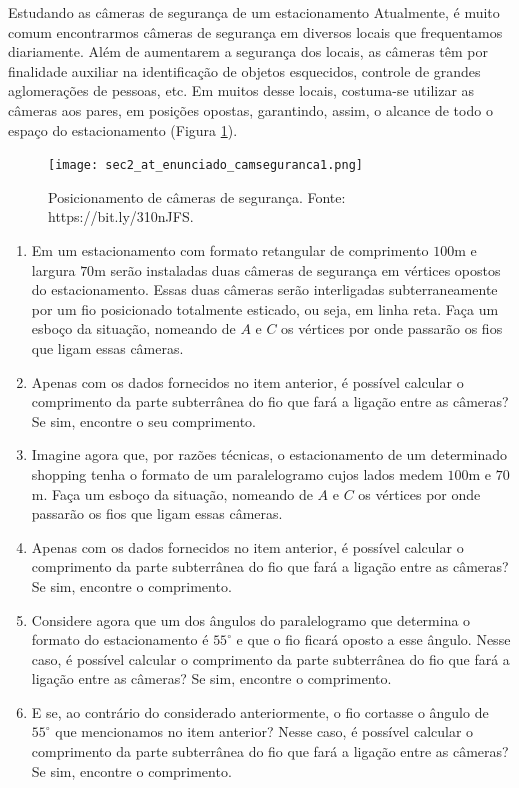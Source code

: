 \begin{task}{Estudando as câmeras de segurança de um estacionamento}
Atualmente, é muito comum encontrarmos câmeras de segurança em diversos locais que frequentamos diariamente. 
%
Além de aumentarem a segurança dos locais, as câmeras têm por finalidade auxiliar na identificação de objetos esquecidos, controle de grandes aglomerações de pessoas, etc. Em muitos desse locais, costuma-se utilizar as câmeras aos pares,  em posições opostas, garantindo, assim, o alcance de todo o espaço do estacionamento (Figura \ref{sec2_at_fig_camseguranca1}). 
 
\begin{figure}[H]
    \centering
    \texttt{[image: sec2\_at\_enunciado\_camseguranca1.png]}
    \caption{Posicionamento de câmeras de segurança. Fonte: https://bit.ly/310nJFS.}
    \label{sec2_at_fig_camseguranca1}
\end{figure}

\begin{enumerate}
    \item{}
    Em um estacionamento com formato retangular de comprimento $100$m e largura $70$m serão instaladas duas câmeras de segurança em vértices opostos do estacionamento. Essas duas câmeras serão interligadas subterraneamente por um fio posicionado totalmente esticado, ou seja, em linha reta. Faça um esboço da situação, nomeando de $A$ e $C$ os vértices por onde passarão os fios que ligam essas câmeras.

    \item{}
    Apenas com os dados fornecidos no item anterior, é possível calcular o comprimento da parte subterrânea do fio que fará a ligação entre as câmeras? Se sim, encontre o seu comprimento.

    \item{}
    Imagine agora que, por razões técnicas, o estacionamento de um determinado shopping tenha o formato de um paralelogramo cujos lados medem $100$m e $70$m. Faça um esboço da situação, nomeando de $A$ e $C$ os vértices por onde passarão os fios que ligam essas câmeras.

    \item{}
    Apenas com os dados fornecidos no item anterior, é possível calcular o comprimento da parte subterrânea do fio que fará a ligação entre as câmeras? Se sim, encontre o comprimento.

    \item{}
    Considere agora que um dos ângulos do paralelogramo que determina o formato do estacionamento é $55^\circ$ e que o fio ficará oposto a esse ângulo. Nesse caso, é possível calcular o comprimento da parte subterrânea do fio que fará a ligação entre as câmeras? Se sim, encontre o comprimento.
    
    \item{}
    E se, ao contrário do considerado anteriormente, o fio cortasse o ângulo de $55^\circ$ que mencionamos no item anterior? Nesse caso, é possível calcular o comprimento da parte subterrânea do fio que fará a ligação entre as câmeras? Se sim, encontre o comprimento.
\end{enumerate}
\end{task}

